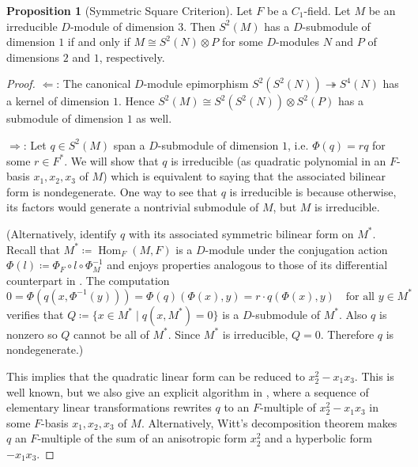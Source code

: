 \documentclass[11pt,reqno]{amsart}
\theoremstyle{definition}
\newtheorem{proposition}[theorem]{Proposition}
\DeclareMathOperator{\Hom}{Hom}
\begin{document}
\begin{proposition}[Symmetric Square Criterion]
\label{prop:sym-square}
  Let $F$ be a $C_{1}$-field. Let $M$ be an irreducible $D$-module of dimension $3$. Then $S^{2} (M)$ has a $D$-submodule of dimension $1$ if and only if $M\cong S^{2} (N)\otimes P$ for some $D$-modules $N$ and $P$ of dimensions $2$ and $1$, respectively.
\end{proposition}
\begin{proof}
$\Leftarrow$: The canonical $D$-module epimorphism $S^2(S^2(N))\twoheadrightarrow S^4(N)$ has a kernel of dimension $1$.
Hence $S^2(M) \cong S^2(S^2(N)) \otimes S^2(P)$ has a submodule of dimension $1$ as well.

$\Rightarrow$: Let $q\in S^2(M)$ span a $D$-submodule of dimension $1$, i.e. $\Phi (q) = rq$ for some $r\in F^{*}$. We will show that $q$ is irreducible (as quadratic polynomial in an $F$-basis $x_1, x_2, x_3$ of $M$) which is equivalent to saying that the associated bilinear form is nondegenerate. One way to see that $q$ is irreducible is because otherwise, its factors would generate a nontrivial submodule of $M$, but $M$ is irreducible.

(Alternatively,
identify $q$ with its associated symmetric bilinear form on $M^{*}$. Recall that $M^*\coloneqq \Hom_F(M,F)$ is a $D$-module under the conjugation action $\Phi(l)\coloneqq \Phi_F\circ l\circ \Phi_M^{-1}$ and enjoys properties analogous to those of its differential counterpart in \cite[page 45]{put2003galois}.
The computation
\[
0=\Phi(q(x,\Phi^{-1}(y)))=\Phi(q)(\Phi(x),y)=r\cdot q(\Phi(x),y)\quad\text{for all $y\in M^*$}
\]
verifies that $Q\coloneqq\{x\in M^{*}\mid q(x,M^{*})=0\}$ is a $D$-submodule of $M^*$. Also $q$ is nonzero so $Q$ cannot be all of $M^*$.
Since $M^*$ is irreducible, $Q=0$. 
Therefore $q$ is nondegenerate.) 

This implies that the quadratic linear form can be reduced to $x_2^2-x_1x_3$. This is well known, but we also give an explicit algorithm in \cite{algo}, where a sequence of elementary linear transformations rewrites $q$ to an $F$-multiple of $x_2^2 - x_1 x_3$ in some $F$-basis $x_1,x_2,x_3$ of $M$.
Alternatively, Witt's decomposition theorem \cite[page 12]{lam2005introduction} makes $q$ an $F$-multiple of the sum of an anisotropic form $x_{2}^{2}$ and a hyperbolic form $-x_1 x_3$. 


\end{proof}
\end{document}
